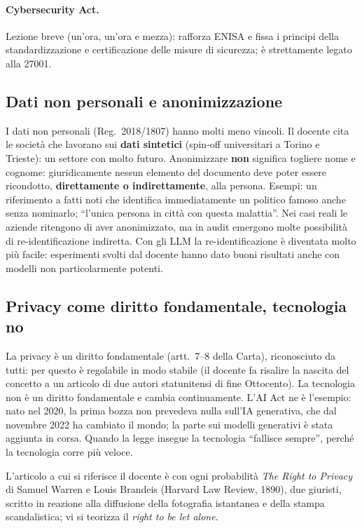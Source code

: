 \paragraph{Cybersecurity Act.} Lezione breve (un'ora, un'ora e mezza): rafforza ENISA e fissa i
principi della standardizzazione e certificazione delle misure di sicurezza; è strettamente legato
alla 27001.

\subsection{Dati non personali e anonimizzazione}
I dati non personali (Reg.~2018/1807) hanno molti meno vincoli. Il docente cita le società che lavorano
sui \textbf{dati sintetici} (spin-off universitari a Torino e Trieste): un settore con molto futuro.
Anonimizzare \textbf{non} significa togliere nome e cognome: giuridicamente nessun elemento del
documento deve poter essere ricondotto, \textbf{direttamente o indirettamente}, alla persona. Esempi:
un riferimento a fatti noti che identifica immediatamente un politico famoso anche senza nominarlo;
``l'unica persona in città con questa malattia''. Nei casi reali le aziende ritengono di aver
anonimizzato, ma in audit emergono molte possibilità di re-identificazione indiretta. Con gli LLM la
re-identificazione è diventata molto più facile: esperimenti svolti dal docente hanno dato buoni
risultati anche con modelli non particolarmente potenti.

\subsection{Privacy come diritto fondamentale, tecnologia no}
La privacy è un diritto fondamentale (artt.~7--8 della Carta), riconosciuto da tutti: per questo è
regolabile in modo stabile (il docente fa risalire la nascita del concetto a un articolo di due
autori statunitensi di fine Ottocento). La tecnologia non è un diritto fondamentale e cambia continuamente.
L'AI Act ne è l'esempio: nato nel 2020, la prima bozza non prevedeva nulla sull'IA generativa, che dal
novembre 2022 ha cambiato il mondo; la parte sui modelli generativi è stata aggiunta in corsa. Quando
la legge insegue la tecnologia ``fallisce sempre'', perché la tecnologia corre più veloce.

\begin{integrazione}
L'articolo a cui si riferisce il docente è con ogni probabilità \emph{The Right to Privacy} di Samuel
Warren e Louis Brandeis (Harvard Law Review, 1890), due giuristi, scritto in reazione alla diffusione
della fotografia istantanea e della stampa scandalistica; vi si teorizza il \emph{right to be let
alone}.
\end{integrazione}

